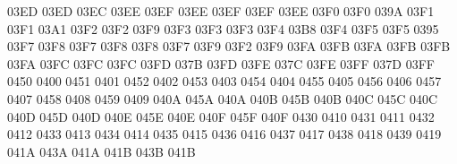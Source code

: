 \setcclcuc 03ED 03ED 03EC %
\setcclcuc 03EE 03EF 03EE %
\setcclcuc 03EF 03EF 03EE %
\setcclcuc 03F0 03F0 039A %
\setcclcuc 03F1 03F1 03A1 %
\setcclcuc 03F2 03F2 03F9 %
\setcclcuc 03F3 03F3 03F3 %
\setcclcuc 03F4 03B8 03F4 %
\setcclcuc 03F5 03F5 0395 %
\setcclcuc 03F7 03F8 03F7 %
\setcclcuc 03F8 03F8 03F7 %
\setcclcuc 03F9 03F2 03F9 %
\setcclcuc 03FA 03FB 03FA %
\setcclcuc 03FB 03FB 03FA %
\setcclcuc 03FC 03FC 03FC %
\setcclcuc 03FD 037B 03FD %
\setcclcuc 03FE 037C 03FE %
\setcclcuc 03FF 037D 03FF %
 0450 0400 %
 0451 0401 %
 0452 0402 %
 0453 0403 %
 0454 0404 %
 0455 0405 %
 0456 0406 %
 0457 0407 %
 0458 0408 %
 0459 0409 %
\setcclcuc 040A 045A 040A %
\setcclcuc 040B 045B 040B %
\setcclcuc 040C 045C 040C %
\setcclcuc 040D 045D 040D %
\setcclcuc 040E 045E 040E %
\setcclcuc 040F 045F 040F %
 0430 0410 %
 0431 0411 %
 0432 0412 %
 0433 0413 %
 0434 0414 %
 0435 0415 %
 0436 0416 %
 0437 0417 %
 0438 0418 %
 0439 0419 %
\setcclcuc 041A 043A 041A %
\setcclcuc 041B 043B 041B %
